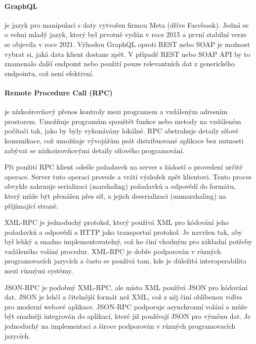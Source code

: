 \documentclass[12pt, a4paper]{article}
\begin{document}
\paragraph{GraphQL}
je jazyk pro manipulaci s daty vytvořen firmou Meta (dříve Facebook). Jedná se o velmi mladý jazyk, který byl prvotně vydán v roce 2015 a první stabilní verze se objevila v roce 2021. Výhodou GraphQL oproti REST nebo SOAP je možnost vybrat si, jaká data klient dostane zpět. V případě REST nebo SOAP API by to znamenalo další endpoint nebo použití pouze relevantních dat z generického endpointu, což není efektivní.
\cite{brito_migrating_2019}
\cite{brito_rest_2020}
\paragraph{Remote Procedure Call (RPC)}
je nízkoúrovňový přenos kontroly mezi programem a vzdáleným adresním prostorem. Umožňuje programům spouštět funkce nebo metody na vzdáleném počítači tak, jako by byly vykonávány lokálně. RPC abstrahuje detaily síťové komunikace, což umožňuje vývojářům psát distribuované aplikace bez nutnosti zabývat se nízkoúrovňovými detaily síťového programování.
\cite{nelson_remote_1981}
\cite{birrell_implementing_1984}

Při použití RPC klient odešle požadavek na server s žádostí o provedení určité operace. Server tuto operaci provede a vrátí výsledek zpět klientovi. Tento proces obvykle zahrnuje serializaci (marshaling) požadavků a odpovědí do formátu, který může být přenášen přes síť, a jejich deserializaci (unmarshaling) na přijímající straně.

XML-RPC je jednoduchý protokol, který používá XML pro kódování jeho požadavků a odpovědí a HTTP jako transportní protokol. Je navržen tak, aby byl lehký a snadno implementovatelný, což ho činí vhodným pro základní potřeby vzdáleného volání procedur. XML-RPC je dobře podporován v různých programovacích jazycích a často se používá tam, kde je důležitá interoperabilita mezi různými systémy.
\cite{userland_software_xml-rpc_1999}

JSON-RPC je podobný XML-RPC, ale místo XML používá JSON pro kódování dat. JSON je lehčí a čitelnější formát než XML, což z něj činí oblíbenou volbu pro moderní webové aplikace. JSON-RPC podporuje asynchronní volání a může být snadněji integrován do aplikací, které již používají JSON pro výměnu dat. Je jednoduchý na implementaci a široce podporován v různých programovacích jazycích.
\cite{json-rpc_working_group_json-rpc_2013}
\end{document}
